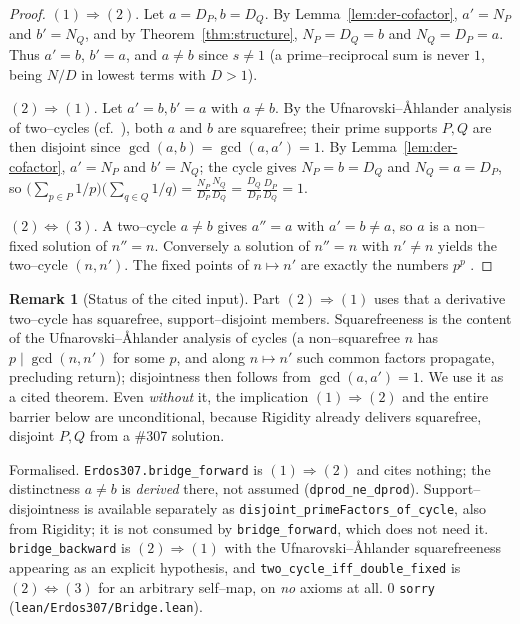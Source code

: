 \documentclass[11pt]{article}
\theoremstyle{definition}
\newtheorem{remark}[theorem]{Remark}
\begin{document}
\begin{proof}
$(1)\Rightarrow(2)$. Let $a=D_P,b=D_Q$. By Lemma~\ref{lem:der-cofactor},
$a'=N_P$ and $b'=N_Q$, and by Theorem~\ref{thm:structure}, $N_P=D_Q=b$ and $N_Q=D_P=a$. Thus
$a'=b$, $b'=a$, and $a\ne b$ since $s\ne1$ (a prime--reciprocal sum is never $1$, being
$N/D$ in lowest terms with $D>1$).

$(2)\Rightarrow(1)$. Let $a'=b,b'=a$ with $a\ne b$. By the Ufnarovski--\AA hlander analysis of
two--cycles (cf.\ \cite{UfnarovskiAhlander2003,Kovic2012}), both $a$ and $b$ are squarefree; their
prime supports $P,Q$ are then disjoint since $\gcd(a,b)=\gcd(a,a')=1$. By
Lemma~\ref{lem:der-cofactor}, $a'=N_P$ and $b'=N_Q$; the
cycle gives $N_P=b=D_Q$ and $N_Q=a=D_P$, so
$\bigl(\sum_{p\in P}1/p\bigr)\bigl(\sum_{q\in Q}1/q\bigr)=\frac{N_P}{D_P}\frac{N_Q}{D_Q}
=\frac{D_Q}{D_P}\frac{D_P}{D_Q}=1$.

$(2)\Leftrightarrow(3)$. A two--cycle $a\ne b$ gives $a''=a$ with $a'=b\ne a$, so $a$ is a non--fixed
solution of $n''=n$. Conversely a solution of $n''=n$ with $n'\ne n$ yields the two--cycle
$(n,n')$. The fixed points of $n\mapsto n'$ are exactly the numbers $p^{p}$
\cite{Barbeau1961,UfnarovskiAhlander2003}.
\end{proof}

\begin{remark}[Status of the cited input]\label{rem:cited}
Part $(2)\Rightarrow(1)$ uses that a derivative two--cycle has squarefree, support--disjoint
members. Squarefreeness is the content of the Ufnarovski--\AA hlander analysis of cycles (a
non--squarefree $n$ has $p\mid\gcd(n,n')$ for some $p$, and along $n\mapsto n'$ such common factors
propagate, precluding return); disjointness then follows from $\gcd(a,a')=1$. We use it as a cited
theorem. Even \emph{without} it, the implication $(1)\Rightarrow(2)$ and the entire barrier below are
unconditional, because Rigidity already delivers squarefree, disjoint $P,Q$ from a \#307 solution.

\textup{Formalised.} \texttt{Erdos307.bridge\_forward} is $(1)\Rightarrow(2)$ and cites nothing;
the distinctness $a\ne b$ is \emph{derived} there, not assumed
\textup{(}\texttt{dprod\_ne\_dprod}\textup{)}. Support--disjointness is available separately as
\texttt{disjoint\_primeFactors\_of\_cycle}, also from Rigidity; it is not consumed by
\texttt{bridge\_forward}, which does not need it.
\texttt{bridge\_backward} is $(2)\Rightarrow(1)$ with the Ufnarovski--\AA hlander squarefreeness
appearing as an explicit hypothesis, and \texttt{two\_cycle\_iff\_double\_fixed} is
$(2)\Leftrightarrow(3)$ for an arbitrary self--map, on \emph{no} axioms at all. $0$ \texttt{sorry}
\textup{(\texttt{lean/Erdos307/Bridge.lean})}.
\end{remark}
\end{document}

